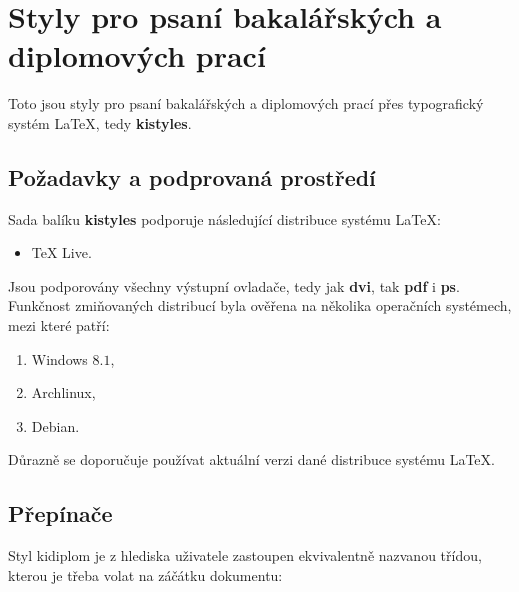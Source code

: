 \documentclass[
  field=inf,
  biblatex,
  glossaries,
  index
]{kidiplom}
\begin{document}
\section{Styly pro psaní bakalářských a diplomových prací}
Toto jsou styly pro psaní bakalářských a diplomových prací přes typografický systém \LaTeX{}, tedy \textbf{kistyles}.

\subsection{Požadavky a podprovaná prostředí}
Sada balíku \textbf{kistyles} podporuje následující distribuce systému \LaTeX{}:
\begin{itemize}
\item \TeX{} Live.
\end{itemize}

Jsou podporovány všechny výstupní ovladače, tedy jak \textbf{dvi}, tak \textbf{pdf} i \textbf{ps}. Funkčnost zmiňovaných distribucí byla ověřena na několika operačních systémech, mezi které patří:
\begin{enumerate}
\item Windows $8.1$,
\item Archlinux,
\item Debian.
\end{enumerate}

Důrazně se doporučuje používat aktuální verzi dané distribuce systému \LaTeX{}.


\subsection{Přepínače}
Styl kidiplom je z hlediska uživatele zastoupen ekvivalentně nazvanou třídou, kterou je třeba volat na záčátku dokumentu:
\end{document}
